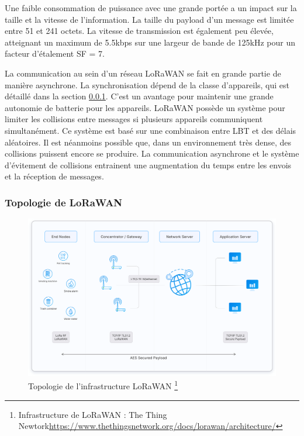 \vspace{0.1cm}

Une faible consommation de puissance avec une grande portée a un impact sur la taille et la vitesse de l'information. La taille du payload d'un message est limitée entre 51 et 241 octets. La vitesse de transmission est également peu élevée, atteignant un maximum de 5.5kbps sur une largeur de bande de 125kHz pour un facteur d'étalement SF = 7.

\vspace{0.1cm}

La communication au sein d'un réseau LoRaWAN se fait en grande partie de manière asynchrone. La synchronisation dépend de la classe d'appareils, qui est détaillé dans la section \ref{topolora}. C'est un avantage pour maintenir une grande autonomie de batterie pour les appareils. LoRaWAN possède un système pour limiter les collisions entre messages si plusieurs appareils communiquent simultanément. Ce système est basé sur une combinaison entre \ac{LBT} et des délais aléatoires\cite{loracolision}. Il est néanmoins possible que, dans un environnement très dense, des collisions puissent encore se produire. La communication asynchrone et le système d'évitement de collisions entrainent une augmentation du temps entre les envois et la réception de messages.

\subsubsection{Topologie de LoRaWAN}\label{topolora}

\begin{figure}[h]
\centering

\includegraphics[scale=0.1]{images/architecture.png}
\caption{Topologie de l'infrastructure LoRaWAN \protect\footnote{Infrastructure de LoRaWAN : The Thing Newtork\href{https://www.thethingsnetwork.org/docs/lorawan/architecture/}{https://www.thethingsnetwork.org/docs/lorawan/architecture/}}}\label{term7}
\end{figure}

